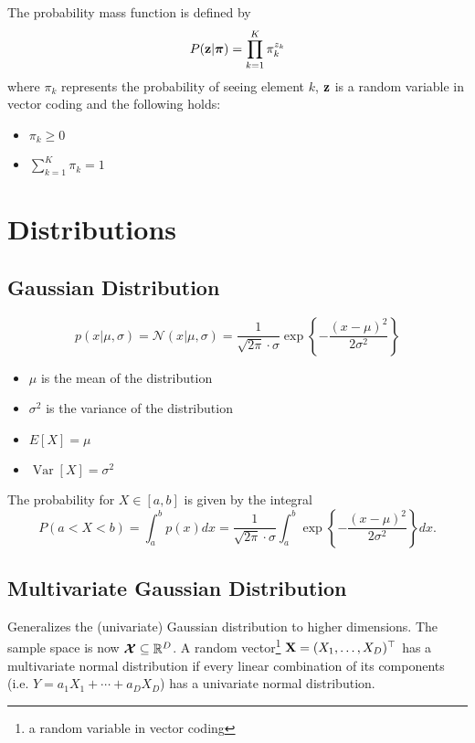 \begin{definition}
The probability mass function is defined by \[
P(\boldsymbol{\mathrm{z}} | \boldsymbol{\mathrm{\pi}}) = \prod_{k=1}^K \pi_k^{z_k}
\]
where \(\pi_k\) represents the probability of seeing element \(k\), \(\boldsymbol{\mathrm{z}}\) is a random variable in vector coding and the following holds:
\begin{itemize}
\item \(\pi_k \geq 0\)
\item \(\sum_{k=1}^K \pi_k = 1\)
\end{itemize}
\end{definition}

\section{Distributions}
\subsection{Gaussian Distribution}
\begin{definition}
\[
p(x|\mu, \sigma) = \mathcal{N}(x|\mu, \sigma) = \frac{1}{\sqrt{2 \pi} \cdot \sigma} \exp \left\lbrace -\frac{(x - \mu)^2}{2\sigma^2} \right\rbrace
\]

\begin{itemize}
\item \(\mu\) is the mean of the distribution
\item \(\sigma^2\) is the variance of the distribution
\end{itemize}
\end{definition}

\begin{remark}\hfill
\begin{itemize}
\item \(E[X] = \mu\)
\item \(\operatorname{Var}[X] = \sigma^2\)
\end{itemize}
\end{remark}

\begin{definition}
The probability for \(X \in [a, b]\) is given by the integral \[
P(a < X < b) = \int_a^b p(x) dx = \frac{1}{\sqrt{2 \pi} \cdot \sigma} \int_a^b \exp \left\lbrace -\frac{(x - \mu)^2}{2\sigma^2} \right\rbrace dx.
\]
\end{definition}

\subsection{Multivariate Gaussian Distribution}
Generalizes the (univariate) Gaussian distribution to higher dimensions. The sample space is now \(\boldsymbol{\mathrm{\mathcal{X}}} \subseteq \mathbb{R}^D\). A random vector\footnote{a random variable in vector coding} \(\boldsymbol{\mathrm{X}} = (X_1, \ldots, X_D)^\top\) has a multivariate normal distribution if every linear combination of its components (i.e. \(Y = a_1 X_1 + \cdots + a_D X_D\)) has a univariate normal distribution.

